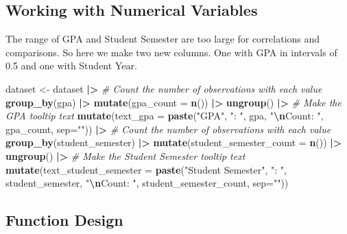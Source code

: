 \documentclass[
  twocolumn]{article}
\newenvironment{Shaded}{\begin{snugshade}}{\end{snugshade}}
\newcommand{\AttributeTok}[1]{\textcolor[rgb]{0.13,0.29,0.53}{#1}}
\newcommand{\CommentTok}[1]{\textcolor[rgb]{0.56,0.35,0.01}{\textit{#1}}}
\newcommand{\FunctionTok}[1]{\textcolor[rgb]{0.13,0.29,0.53}{\textbf{#1}}}
\newcommand{\NormalTok}[1]{#1}
\newcommand{\OtherTok}[1]{\textcolor[rgb]{0.56,0.35,0.01}{#1}}
\newcommand{\SpecialCharTok}[1]{\textcolor[rgb]{0.81,0.36,0.00}{\textbf{#1}}}
\newcommand{\StringTok}[1]{\textcolor[rgb]{0.31,0.60,0.02}{#1}}
\begin{document}
\subsection{Working with Numerical
Variables}\label{working-with-numerical-variables}

The range of GPA and Student Semester are too large for correlations and
comparisons. So here we make two new columns. One with GPA in intervals
of 0.5 and one with Student Year.

\begin{Shaded}
\begin{Highlighting}[]
\NormalTok{dataset }\OtherTok{\textless{}{-}}\NormalTok{ dataset }\SpecialCharTok{|\textgreater{}}
  \CommentTok{\# Count the number of observations with each value}
  \FunctionTok{group\_by}\NormalTok{(gpa) }\SpecialCharTok{|\textgreater{}}
  \FunctionTok{mutate}\NormalTok{(}\AttributeTok{gpa\_count =} \FunctionTok{n}\NormalTok{()) }\SpecialCharTok{|\textgreater{}}
  \FunctionTok{ungroup}\NormalTok{() }\SpecialCharTok{|\textgreater{}}
  \CommentTok{\# Make the GPA tooltip text}
  \FunctionTok{mutate}\NormalTok{(}\AttributeTok{text\_gpa =} \FunctionTok{paste}\NormalTok{(}\StringTok{"GPA"}\NormalTok{, }\StringTok{": "}\NormalTok{, gpa, }\StringTok{"}\SpecialCharTok{\textbackslash{}n}\StringTok{Count: "}\NormalTok{, gpa\_count, }\AttributeTok{sep=}\StringTok{""}\NormalTok{)) }\SpecialCharTok{|\textgreater{}}
  \CommentTok{\# Count the number of observations with each value}
  \FunctionTok{group\_by}\NormalTok{(student\_semester) }\SpecialCharTok{|\textgreater{}}
  \FunctionTok{mutate}\NormalTok{(}\AttributeTok{student\_semester\_count =} \FunctionTok{n}\NormalTok{()) }\SpecialCharTok{|\textgreater{}}
  \FunctionTok{ungroup}\NormalTok{() }\SpecialCharTok{|\textgreater{}}
  \CommentTok{\# Make the Student Semester tooltip text}
  \FunctionTok{mutate}\NormalTok{(}\AttributeTok{text\_student\_semester =} \FunctionTok{paste}\NormalTok{(}\StringTok{"Student Semester"}\NormalTok{, }\StringTok{": "}\NormalTok{, student\_semester, }\StringTok{"}\SpecialCharTok{\textbackslash{}n}\StringTok{Count: "}\NormalTok{, student\_semester\_count, }\AttributeTok{sep=}\StringTok{""}\NormalTok{))}
\end{Highlighting}
\end{Shaded}

\subsection{Function Design}\label{function-design}
\end{document}
